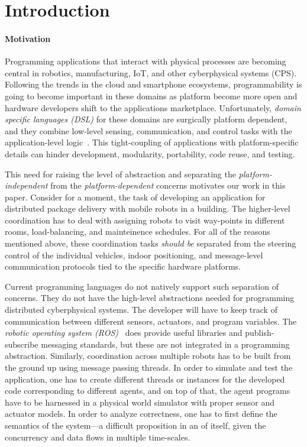 \section{Introduction}
\label{sec:intro}

\paragraph{Motivation}
Programming applications that interact with physical processes are becoming central in  robotics, manufacturing, IoT, and other cyberphysical systems (CPS).  Following the trends in the cloud and smartphone ecosystems, programmability is going to become  important in these domains as platform become more open and hardware developers shift to the  applications marketplace. Unfortunately, {\em domain specific languages (DSL)\/} for these domains are surgically platform dependent, and they combine  low-level sensing, communication, and control tasks with the application-level logic~\cite{nordmann2014robotics}. This  tight-coupling of applications with platform-specific details can hinder development, modularity, portability, code reuse, and testing. 

This need for raising the level of abstraction and separating the \emph{platform-independent} from the \emph{platform-dependent} concerns motivates our work in this paper. Consider for a moment, the task of developing an application for distributed package delivery with mobile robots in a building. The higher-level coordination has to deal with assigning robots to visit way-points in different rooms, load-balancing, and mainteinence schedules.  For all of the reasons mentioned above, these coordination tasks {\em should be\/} separated from the  steering control of the individual vehicles, indoor positioning, and message-level communication protocols tied to the specific hardware platforms. 

Current programming languages do not natively support such separation of concerns. They do not have the high-level abstractions needed for programming distributed cyberphysical systems.  The developer will have to keep track of communication between different sensors, actuators, and program variables. The {\em robotic operating system (ROS)}~\cite{rosbridge_suite,ros} does provide useful libraries and  publish-subscribe messaging standards, but these are not integrated in a programming abstraction. Similarly, coordination across multiple robots has to be built from the ground up using message passing threads. In order to simulate and test the application, one has to create different threads or instances for the developed code corresponding to different agents, and on top of that, the agent programs have to be harnessed in a physical world simulator with proper sensor and actuator models. In order to analyze correctness, one has to first define the semantics of the system---a difficult proposition in an of itself, given the concurrency and data flows in multiple time-scales. 

